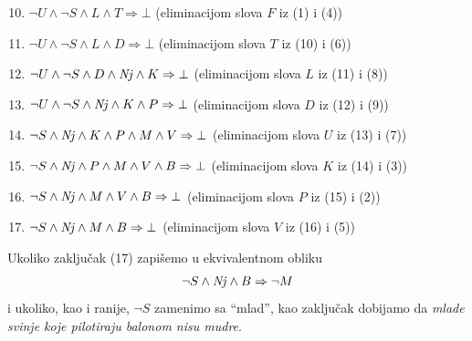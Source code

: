\begin{enumerate}\setcounter{enumi}{9}
\item%
  $\lnot U \land \lnot S \land L \land T \Rightarrow \bot$
  (eliminacijom slova $F$ iz (1) i (4))
\item%
  $\lnot U \land \lnot S \land L \land D \Rightarrow \bot$
  (eliminacijom slova $T$ iz (10) i (6))
\item%
  $\lnot U \land \lnot S \land D \land \mathit{Nj} \land K \Rightarrow \bot$
  (eliminacijom slova $L$ iz (11) i (8))
\item%
  $\lnot U \land \lnot S \land \mathit{Nj} \land K \land P \Rightarrow \bot$
  (eliminacijom slova $D$ iz (12) i (9))
\item%
  $\lnot S \land \mathit{Nj} \land K \land P \land M \land V \Rightarrow \bot$
  (eliminacijom slova $U$ iz (13) i (7))
\item%
  $\lnot S \land \mathit{Nj} \land P \land M \land V \land B \Rightarrow \bot$
  (eliminacijom slova $K$ iz (14) i (3))
\item%
  $\lnot S \land \mathit{Nj} \land M \land V \land B \Rightarrow \bot$
  (eliminacijom slova $P$ iz (15) i (2))
\item%
  $\lnot S \land \mathit{Nj} \land M \land B \Rightarrow \bot$
  (eliminacijom slova $V$ iz (16) i (5))
\end{enumerate}
Ukoliko zaklju\v cak (17) zapi\v semo u ekvivalentnom obliku
$$
  \lnot S \land \mathit{Nj} \land B \Rightarrow \lnot M
$$
i ukoliko, kao i ranije, $\lnot S$ zamenimo sa \enquote{mlad},
kao zaklju\v cak dobijamo da \emph{mlade svinje koje pilotiraju balonom nisu mudre}.



